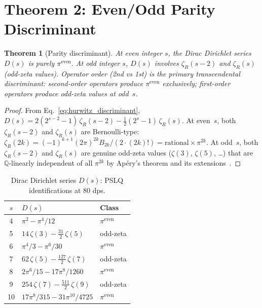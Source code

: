 \documentclass[11pt]{article}
\newtheorem{theorem}{Theorem}
\begin{document}
\section{Theorem 2: Even/Odd Parity Discriminant}
\label{sec:parity}

\begin{theorem}[Parity discriminant]
\label{thm:parity}
At even integer $s$, the Dirac Dirichlet series $D(s)$ is purely
$\pi^{\mathrm{even}}$.  At odd integer $s$, $D(s)$ involves
$\zeta_R(s{-}2)$ and $\zeta_R(s)$ (odd-zeta values).  Operator order
(2nd vs 1st) is the primary transcendental discriminant: second-order
operators produce $\pi^{\mathrm{even}}$ exclusively; first-order
operators produce odd-zeta values at odd~$s$.
\end{theorem}

\begin{proof}
From Eq.~\eqref{eq:hurwitz_discriminant},
$D(s) = 2(2^{s-2} - 1)\,\zeta_R(s{-}2)
       - \tfrac{1}{2}(2^s - 1)\,\zeta_R(s)$.
At even~$s$, both $\zeta_R(s{-}2)$ and $\zeta_R(s)$ are Bernoulli-type:
$\zeta_R(2k) = (-1)^{k+1} (2\pi)^{2k} B_{2k} / (2 \cdot (2k)!)
= \mathrm{rational} \times \pi^{2k}$.  At odd~$s$, both
$\zeta_R(s{-}2)$ and $\zeta_R(s)$ are genuine odd-zeta values
($\zeta(3)$, $\zeta(5)$, \ldots) that are $\mathbb{Q}$-linearly
independent of all $\pi^{2k}$ by Ap\'ery's theorem and its
extensions~\cite{apery1979,rivoal2000}.
\end{proof}

\begin{table}[h]
\centering
\caption{Dirac Dirichlet series $D(s)$: PSLQ identifications at 80 dps.}
\label{tab:D_values}
\begin{tabular}{@{}cll@{}}
\toprule
$s$ & $D(s)$ & Class \\
\midrule
4 & $\pi^2 - \pi^4/12$ & $\pi^{\mathrm{even}}$ \\
5 & $14\,\zeta(3) - \tfrac{31}{2}\,\zeta(5)$ & odd-zeta \\
6 & $\pi^4/3 - \pi^6/30$ & $\pi^{\mathrm{even}}$ \\
7 & $62\,\zeta(5) - \tfrac{127}{2}\,\zeta(7)$ & odd-zeta \\
8 & $2\pi^6/15 - 17\pi^8/1260$ & $\pi^{\mathrm{even}}$ \\
9 & $254\,\zeta(7) - \tfrac{511}{2}\,\zeta(9)$ & odd-zeta \\
10 & $17\pi^8/315 - 31\pi^{10}/4725$ & $\pi^{\mathrm{even}}$ \\
\bottomrule
\end{tabular}
\end{table}
\end{document}
